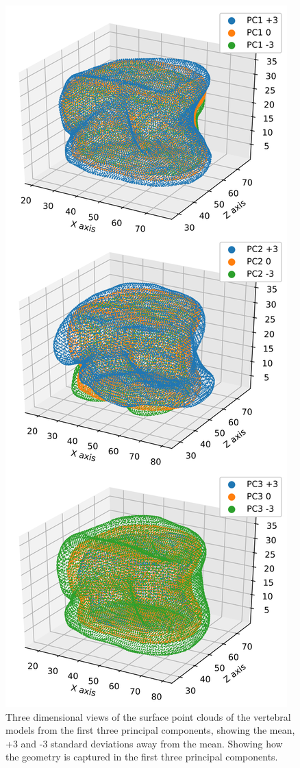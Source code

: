 \begin{figure}[p]
  \centering
  \includegraphics[width=.65\textwidth]{Chapters/Chapter_PCA_images/PC1_2_3_3D.pdf}
  \caption{Three dimensional views of the surface point clouds of the vertebral models from the first three principal components, showing the mean, +3 and -3 standard deviations away from the mean. Showing how the geometry is captured in the first three principal components.}
  \label{fig:PC1_2_3_3D}
\end{figure}


